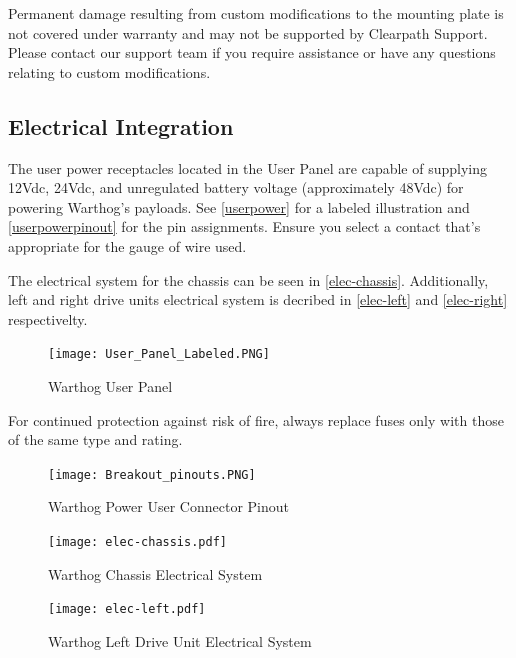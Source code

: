 \documentclass[]{clearpath-latex/clearpath-manual}
\begin{document}
\begin{warning}[]
Permanent damage resulting from custom modifications to the mounting plate is not covered under warranty and may not be supported by Clearpath Support.  Please contact our support team if you require assistance or have any questions relating to custom modifications.
\end{warning}


\pagebreak[4]
\subsection{Electrical Integration}
\label{electrical}

The user power receptacles located in the User Panel are capable of supplying 12Vdc, 24Vdc, and unregulated battery voltage (approximately 48Vdc) for powering Warthog's payloads. See \autoref{userpower} for a labeled illustration and \autoref{userpowerpinout} for the pin assignments. Ensure you select a contact that's appropriate for the gauge of wire used.

The electrical system for the chassis can be seen in \autoref{elec-chassis}. Additionally, left and right drive units electrical system is decribed in \autoref{elec-left} and \autoref{elec-right} respectivelty.





\begin{figure}[!h]
  \centering
  \texttt{[image: User\_Panel\_Labeled.PNG]}
  \caption{Warthog User Panel}
  \label{userpower}
\end{figure}


\begin{warning}
For continued protection against risk of fire, always replace fuses only with those of the same type and rating.
\end{warning}


\begin{figure}[!htb]
  \centering
  \texttt{[image: Breakout\_pinouts.PNG]}
  \caption{Warthog Power User Connector Pinout}
  \label{userpowerpinout}
\end{figure}

\pagebreak
\begin{figure}[!htb]
  \centering
  \texttt{[image: elec-chassis.pdf]}
  \caption{Warthog Chassis Electrical System}
  \label{elec-chassis}
\end{figure}

\begin{figure}[!htb]
  \centering
  \texttt{[image: elec-left.pdf]}
  \caption{Warthog Left Drive Unit Electrical System}
  \label{elec-left}
\end{figure}
\end{document}
